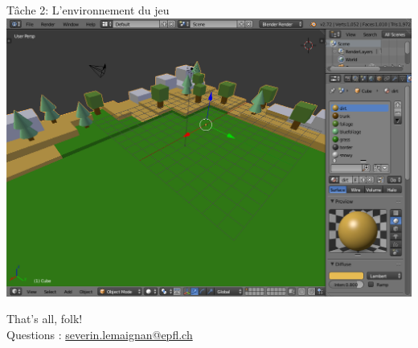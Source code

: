 \documentclass[compress]{beamer}
\begin{document}
\begin{frame}{Tâche 2: L'environnement du jeu}
         \centering
        \includegraphics[width=0.9\linewidth]{env}
\end{frame}


\begin{frame}{}
    \begin{center}
        \Large
        That's all, folk!\\[2em]
        \normalsize
        Questions : \url{severin.lemaignan@epfl.ch} \\
    \end{center}
\end{frame}
\end{document}
